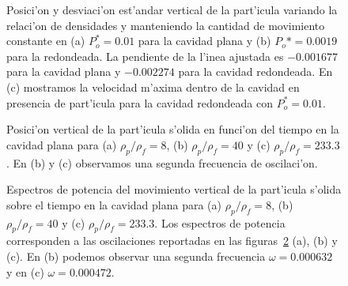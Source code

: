 \begin{figure} 



\caption{\label{fig:barrido-rho}
Posici'on y desviaci'on est'andar vertical de la part'icula variando la relaci'on de densidades
y manteniendo la cantidad de movimiento constante en (a) $P_o^\ast=0.01$ para la cavidad plana y 
(b) $P_o\ast=0.0019$ para la redondeada. 
La pendiente de la l'inea ajustada es $-0.001677$ para la cavidad plana y $-0.002274$
para la cavidad redondeada. En (c) mostramos
la velocidad m'axima dentro de la cavidad en presencia de part'icula  para la cavidad redondeada con
$P_o^\ast=0.01$. }
\end{figure}
%
\begin{figure} 



\caption{\label{fig:paths-flat}
Posici'on vertical de la part'icula s'olida en funci'on  del tiempo en la cavidad plana para
(a) $ \rho_p/\rho_f = 8$, (b) $\rho_p/\rho_f = 40$ y (c) $\rho_p/\rho_f = 233.3$. En (b)
y (c) observamos una segunda frecuencia de oscilaci'on.
}
\end{figure}
%
\begin{figure} 



\caption{\label{fig:spectrum-flat}
Espectros de potencia del movimiento vertical de la part'icula s'olida sobre el tiempo en la cavidad plana para
(a) $\rho_p/\rho_f = 8$, (b) $\rho_p/\rho_f = 40$ y (c) $\rho_p/\rho_f = 233.3$. 
Los espectros de potencia corresponden a las oscilaciones reportadas en las figuras~\ref{fig:paths-flat} (a), (b) y (c). 
En (b) podemos observar una segunda frecuencia $\omega=0.000632$ y en (c) $\omega=0.000472$.
}
\end{figure}

